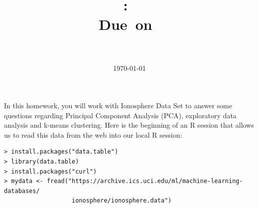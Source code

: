 \documentclass{article}
\title{
\vspace{2in}
\textmd{\textbf{\hmwkClass:\ \hmwkTitle}}\\
\normalsize\vspace{0.1in}\small{Due\ on\ \hmwkDueDate}\\
\vspace{0.1in}\large{\textit{\hmwkClassInstructor\ }}
\vspace{3in}
}
\author{\textbf{\hmwkAuthorName}}
\date{\today} %
\begin{document}
\maketitle



\newpage


In this homework, you will work with 
Ionosphere Data Set  to answer some questions regarding  Principal Component Analysis (PCA), exploratory data analysis and k-means clustering.  Here is the beginning of an R session that allows us to read this data from the web into our local R session:
\begin{verbatim}
> install.packages("data.table")
> library(data.table)
> install.packages("curl")
> mydata <- fread("https://archive.ics.uci.edu/ml/machine-learning-databases/
                   ionosphere/ionosphere.data")
             
\end{verbatim}


\end{document}
